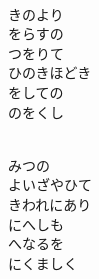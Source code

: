 \documentclass[10pt,b5j]{tarticle} %
\begin{document}
\begin{enumerate}
\begin{minipage}[c]{\blocksize}
        \vspace{\linespace}
        \item~\\
        きのより\\
        をらすの\\
        つをりて\\
        ひのきほどき\\
        をしての\\
        のをくし
        
        
        \vspace{\linespace}
        \item~\\
        みつの\\
        よいざやひて\\
        きわれにあり\\
        にへしも\\
        へなるを\\
        にくましく
    
    \end{minipage}
\end{enumerate} %
\end{document}
